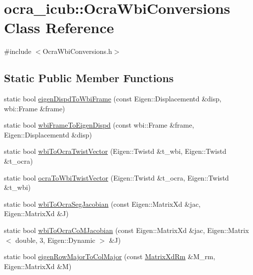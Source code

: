 \hypertarget{classocra__icub_1_1OcraWbiConversions}{}\section{ocra\+\_\+icub\+:\+:Ocra\+Wbi\+Conversions Class Reference}
\label{classocra__icub_1_1OcraWbiConversions}


{\ttfamily \#include $<$Ocra\+Wbi\+Conversions.\+h$>$}

\subsection*{Static Public Member Functions}
\begin{DoxyCompactItemize}
\item 
static bool \hyperlink{classocra__icub_1_1OcraWbiConversions_af71562a5f3d4f6e649f1cec0a3d9996b}{eigen\+Dispd\+To\+Wbi\+Frame} (const Eigen\+::\+Displacementd \&disp, wbi\+::\+Frame \&frame)
\item 
static bool \hyperlink{classocra__icub_1_1OcraWbiConversions_a403627efa183c8ddbbccabf0dcd5bcaf}{wbi\+Frame\+To\+Eigen\+Dispd} (const wbi\+::\+Frame \&frame, Eigen\+::\+Displacementd \&disp)
\item 
static bool \hyperlink{classocra__icub_1_1OcraWbiConversions_a37c2aea3bf156928cb90a16655c24cc9}{wbi\+To\+Ocra\+Twist\+Vector} (Eigen\+::\+Twistd \&t\+\_\+wbi, Eigen\+::\+Twistd \&t\+\_\+ocra)
\item 
static bool \hyperlink{classocra__icub_1_1OcraWbiConversions_a7725aea95eb71c805def4a064a2693fa}{ocra\+To\+Wbi\+Twist\+Vector} (Eigen\+::\+Twistd \&t\+\_\+ocra, Eigen\+::\+Twistd \&t\+\_\+wbi)
\item 
static bool \hyperlink{classocra__icub_1_1OcraWbiConversions_a25a64172ebb14db9ddf301880a433964}{wbi\+To\+Ocra\+Seg\+Jacobian} (const Eigen\+::\+Matrix\+Xd \&jac, Eigen\+::\+Matrix\+Xd \&J)
\item 
static bool \hyperlink{classocra__icub_1_1OcraWbiConversions_a86458de950caa3bde3aa1d1aff448be1}{wbi\+To\+Ocra\+Co\+M\+Jacobian} (const Eigen\+::\+Matrix\+Xd \&jac, Eigen\+::\+Matrix$<$ double, 3, Eigen\+::\+Dynamic $>$ \&J)
\item 
static bool \hyperlink{classocra__icub_1_1OcraWbiConversions_ac03ed9581c49479b3ade94d58a3295b4}{eigen\+Row\+Major\+To\+Col\+Major} (const \hyperlink{namespaceocra__icub_aa5e36a19ed031c28ca83c207bd7dd83f}{Matrix\+Xd\+Rm} \&M\+\_\+rm, Eigen\+::\+Matrix\+Xd \&M)
\item 

\end{DoxyCompactItemize}
